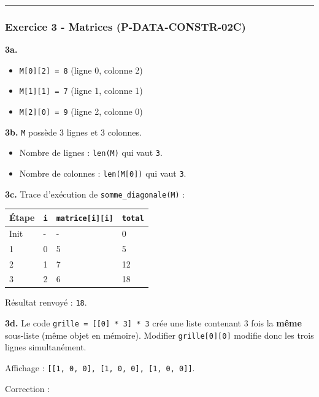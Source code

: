 \begin{center}\rule{0.5\linewidth}{0.5pt}\end{center}

\subsubsection{Exercice 3 - Matrices (P-DATA-CONSTR-02C)}

\textbf{3a.}

\begin{itemize}
\tightlist
\item
  \texttt{M{[}0{]}{[}2{]}\ =\ 8} (ligne 0, colonne 2)
\item
  \texttt{M{[}1{]}{[}1{]}\ =\ 7} (ligne 1, colonne 1)
\item
  \texttt{M{[}2{]}{[}0{]}\ =\ 9} (ligne 2, colonne 0)
\end{itemize}

\textbf{3b.} \texttt{M} possède 3 lignes et 3 colonnes.

\begin{itemize}
\tightlist
\item
  Nombre de lignes : \texttt{len(M)} qui vaut \texttt{3}.
\item
  Nombre de colonnes : \texttt{len(M{[}0{]})} qui vaut \texttt{3}.
\end{itemize}

\textbf{3c.} Trace d'exécution de \texttt{somme\_diagonale(M)} :

\begin{longtable}[]{@{}llll@{}}
\toprule\noalign{}
Étape & \texttt{i} & \texttt{matrice{[}i{]}{[}i{]}} & \texttt{total} \\
\midrule\noalign{}
\endhead
\bottomrule\noalign{}
\endlastfoot
Init & - & - & 0 \\
1 & 0 & 5 & 5 \\
2 & 1 & 7 & 12 \\
3 & 2 & 6 & 18 \\
\end{longtable}

Résultat renvoyé : \texttt{18}.

\textbf{3d.} Le code \texttt{grille\ =\ {[}{[}0{]}\ *\ 3{]}\ *\ 3} crée
une liste contenant 3 fois la \textbf{même} sous-liste (même objet en
mémoire). Modifier \texttt{grille{[}0{]}{[}0{]}} modifie donc les trois
lignes simultanément.

Affichage :
\texttt{{[}{[}1,\ 0,\ 0{]},\ {[}1,\ 0,\ 0{]},\ {[}1,\ 0,\ 0{]}{]}}.

Correction :

